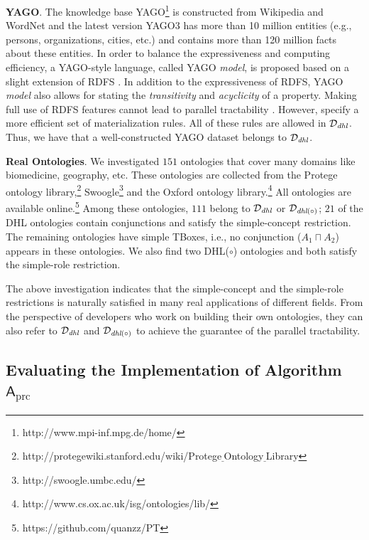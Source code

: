 \textbf{YAGO}. The knowledge base YAGO\footnote{http://www.mpi-inf.mpg.de/home/}
is constructed from Wikipedia and WordNet and the latest version
YAGO3 \cite{MahdisoltaniBS15} has more than 10 million entities
(e.g., persons, organizations, cities, etc.)
and contains more than 120 million facts about these entities.
In order to balance the expressiveness and computing efficiency,
a YAGO-style language, called YAGO \emph{model}, is proposed based on
a slight extension of RDFS \cite{SuchanekKW08}.
In addition to the expressiveness of RDFS,
YAGO \emph{model} also allows for stating the \emph{transitivity} and \emph{acyclicity} of a property.
Making full use of RDFS features cannot lead to parallel tractability \cite{Horst05}.
However, \citet{SuchanekKW08} specify a more efficient set of materialization rules.
All of these rules are allowed in $\mathcal{D}_{\textit{\text{dhl}}}$.
Thus, we have that a well-constructed YAGO dataset belongs to $\mathcal{D}_{\textit{\text{dhl}}}$.

\textbf{Real Ontologies}. We investigated
$151$ ontologies that cover many domains
like biomedicine, geography, etc.
These ontologies are collected
from the Protege ontology library,\footnote{http://protegewiki.stanford.edu/wiki/Protege$\underline{~}$Ontology$\underline{~}$Library}
Swoogle\footnote{http://swoogle.umbc.edu/}
and the Oxford ontology library.\footnote{http://www.cs.ox.ac.uk/isg/ontologies/lib/}
All ontologies are available online.\footnote{https://github.com/quanzz/PT}
Among these ontologies, $111$ belong to $\mathcal{D}_{\textit{\text{dhl}}}$
or $\mathcal{D}_{\textit{\text{dhl}}(\circ)}$; $21$ of the DHL ontologies contain
conjunctions and satisfy the simple-concept restriction.
The remaining ontologies have simple TBoxes, i.e., no conjunction ($A_1\sqcap A_2$)
appears in these ontologies.
We also find two DHL($\circ$) ontologies and both satisfy the simple-role restriction.

The above investigation indicates that the simple-concept and the simple-role restrictions
is naturally satisfied in many real applications of different fields.
From the perspective of developers who work on building their own ontologies,
they can also refer to $\mathcal{D}_{\textit{\text{dhl}}}$ and $\mathcal{D}_{\textit{\text{dhl}}(\circ)}$
to achieve the guarantee of the parallel tractability.


\subsection{Evaluating the Implementation of Algorithm~$\mathsf{A}_{\text{prc}}$}

